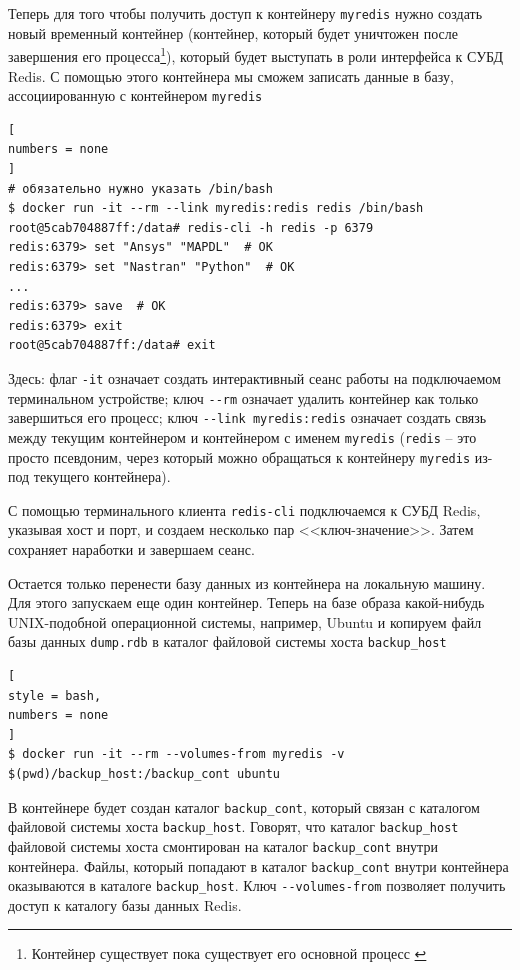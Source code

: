 \documentclass[%
	11pt,
	a4paper,
	utf8,
		]{article}
\begin{document}
Теперь для того чтобы получить доступ к контейнеру \texttt{myredis} нужно создать новый временный контейнер (контейнер, который будет уничтожен после завершения его процесса\footnote{Контейнер существует пока существует его основной процесс \cite{mouat:docker-2017}}), который будет выступать в роли интерфейса к СУБД Redis. С помощью этого контейнера мы сможем записать данные в базу, ассоциированную с контейнером \texttt{myredis}
\begin{lstlisting}[
numbers = none
]
# обязательно нужно указать /bin/bash
$ docker run -it --rm --link myredis:redis redis /bin/bash
root@5cab704887ff:/data# redis-cli -h redis -p 6379
redis:6379> set "Ansys" "MAPDL"  # OK
redis:6379> set "Nastran" "Python"  # OK
...
redis:6379> save  # OK
redis:6379> exit
root@5cab704887ff:/data# exit
\end{lstlisting}

Здесь: флаг \verb|-it| означает создать интерактивный сеанс работы на подключаемом терминальном устройстве; ключ \verb|--rm| означает удалить контейнер как только завершиться его процесс; ключ \verb|--link myredis:redis| означает создать связь между текущим контейнером и контейнером с именем \texttt{myredis} (\texttt{redis} -- это просто псевдоним, через который можно обращаться к контейнеру \texttt{myredis} из-под текущего контейнера).

С помощью терминального клиента \texttt{redis-cli} подключаемся к СУБД Redis, указывая хост и порт, и создаем несколько пар <<ключ-значение>>. Затем сохраняет наработки и завершаем сеанс.

Остается только перенести базу данных из контейнера на локальную машину. Для этого запускаем еще один контейнер. Теперь на базе образа какой-нибудь UNIX-подобной операционной системы, например, Ubuntu и копируем файл базы данных \texttt{dump.rdb} в каталог файловой системы хоста \texttt{backup\_host}
\begin{lstlisting}[
style = bash,
numbers = none
]
$ docker run -it --rm --volumes-from myredis -v $(pwd)/backup_host:/backup_cont ubuntu
\end{lstlisting}

В контейнере будет создан каталог \texttt{backup\_cont}, который связан с каталогом файловой системы хоста \texttt{backup\_host}. Говорят, что каталог \texttt{backup\_host} файловой системы хоста смонтирован на каталог \texttt{backup\_cont} внутри контейнера. Файлы, который попадают в каталог \texttt{backup\_cont} внутри контейнера оказываются в каталоге \texttt{backup\_host}. Ключ \verb|--volumes-from| позволяет получить доступ к каталогу базы данных Redis.
\end{document}
